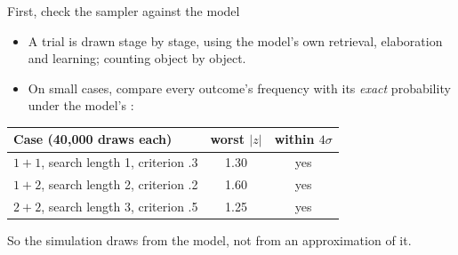 \documentclass[aspectratio=169,11pt]{beamer}
\begin{document}
\begin{frame}{First, check the sampler against the model}
  \begin{itemize}
    \item A trial is drawn stage by stage, using the model's own retrieval, elaboration and learning; counting object by object.
    \item On small cases, compare every outcome's frequency with its \emph{exact} probability under the model's :
  \end{itemize}
  \begin{center}
  \begin{tabular}{lcc}
    \toprule
    Case (40{,}000 draws each) & worst $|z|$ & within $4\sigma$\\
    \midrule
    $1+1$, search length 1, criterion .3 & 1.30 & yes\\
    $1+2$, search length 2, criterion .2 & 1.60 & yes\\
    $2+2$, search length 3, criterion .5 & 1.25 & yes\\
    \bottomrule
  \end{tabular}
  \end{center}
  So the simulation draws from the model, not from an approximation of it.
\end{frame}
\end{document}

